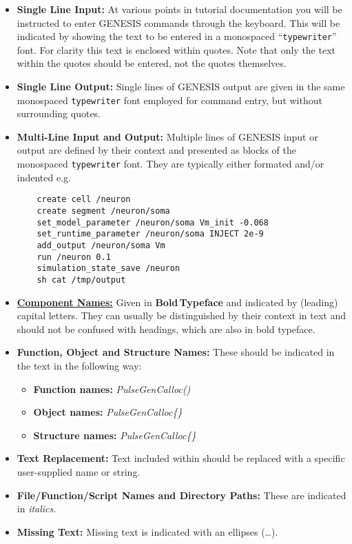 \documentclass[12pt]{article}
\begin{document}
\begin{itemize}

\item[]{\bf Single Line Input:} At various points in tutorial documentation you will be instructed to enter GENESIS commands through the keyboard. This will be indicated by showing the text to be entered in a monospaced ``{\tt typewriter}'' font. For clarity this text is enclosed within quotes. Note that only the text within the quotes should be entered, not the quotes themselves.

\item[]{\bf Single Line Output:} Single lines of GENESIS output are given in the same monospaced {\tt typewriter} font employed for command entry, but without surrounding quotes.

\item[]{\bf Multi-Line Input and Output:} Multiple lines of GENESIS input or output are defined by their context and presented as blocks of the monospaced {\tt typewriter} font. They are typically either formated and/or indented e.g.

\begin{verbatim}
    create cell /neuron
    create segment /neuron/soma
    set_model_parameter /neuron/soma Vm_init -0.068
    set_runtime_parameter /neuron/soma INJECT 2e-9
    add_output /neuron/soma Vm
    run /neuron 0.1
    simulation_state_save /neuron
    sh cat /tmp/output
\end{verbatim}

\item[]\href{../reserved-words/reserved-words.tex}{\bf Component Names:} Given in {\bf Bold\,Typeface} and indicated by (leading) capital letters. They can usually be distinguished by their context in text and should not be confused with headings, which are also in bold typeface.

\item[]{\bf Function, Object and Structure Names:} These should be indicated in the text in the following way:

   \begin{itemize}
      \item[]{\bf Function names:} {\it PulseGenCalloc()}
      \item[]{\bf Object names:} {\it PulseGenCalloc\{\}}
      \item[]{\bf Structure names:} {\it PulseGenCalloc\{\}}
   \end{itemize}

\item[]{\bf Text Replacement:} Text included within {\tt <angle brackets>} should be replaced with a specific user-supplied name or string.

\item[]{\bf File/Function/Script Names and Directory Paths:} These are indicated in {\it italics}.

\item[]{\bf Missing Text:} Missing text is indicated with an ellipses (\ldots).

\end{itemize}
\end{document}
